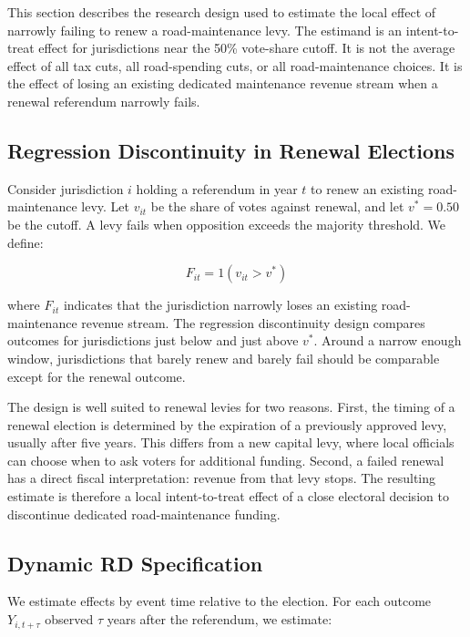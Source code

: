 ﻿This section describes the research design used to estimate the local effect of narrowly failing to renew a road-maintenance levy. The estimand is an intent-to-treat effect for jurisdictions near the 50\% vote-share cutoff. It is not the average effect of all tax cuts, all road-spending cuts, or all road-maintenance choices. It is the effect of losing an existing dedicated maintenance revenue stream when a renewal referendum narrowly fails.

\subsection{Regression Discontinuity in Renewal Elections}

Consider jurisdiction $i$ holding a referendum in year $t$ to renew an existing road-maintenance levy. Let $v_{it}$ be the share of votes against renewal, and let $v^* = 0.50$ be the cutoff. A levy fails when opposition exceeds the majority threshold. We define:

\begin{equation}
F_{it} = 1(v_{it} > v^*)
\end{equation}

\noindent where $F_{it}$ indicates that the jurisdiction narrowly loses an existing road-maintenance revenue stream. The regression discontinuity design compares outcomes for jurisdictions just below and just above $v^*$. Around a narrow enough window, jurisdictions that barely renew and barely fail should be comparable except for the renewal outcome.

The design is well suited to renewal levies for two reasons. First, the timing of a renewal election is determined by the expiration of a previously approved levy, usually after five years. This differs from a new capital levy, where local officials can choose when to ask voters for additional funding. Second, a failed renewal has a direct fiscal interpretation: revenue from that levy stops. The resulting estimate is therefore a local intent-to-treat effect of a close electoral decision to discontinue dedicated road-maintenance funding.

\subsection{Dynamic RD Specification}

We estimate effects by event time relative to the election. For each outcome $Y_{i,t+\tau}$ observed $\tau$ years after the referendum, we estimate:

